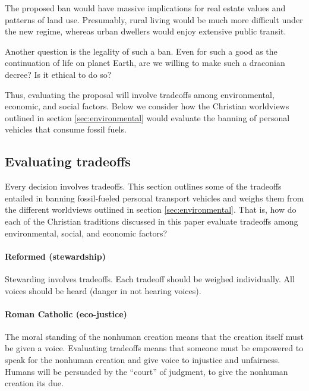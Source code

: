 \documentclass[12pt]{article}
\begin{document}
The proposed ban would have massive implications for real estate values 
and patterns of land use. 
Presumably, rural living would be much more difficult under the new regime,
whereas urban dwellers would enjoy extensive public transit.

Another question is the legality of such a ban. 
Even for such a good as the continuation of life on planet Earth,
are we willing to make such a draconian decree? Is it ethical to do so?

Thus, evaluating the proposal will involve tradeoffs among environmental, economic, and social factors.
Below we consider how the Christian worldviews outlined in section \ref{sec:environmental}
would evaluate the banning of personal vehicles that consume fossil fuels.


\subsection{Evaluating tradeoffs}
\label{sec:evaluating_tradeoffs}
Every decision involves tradeoffs. This section outlines some of the tradeoffs entailed in banning fossil-fueled personal transport vehicles 
and weighs them from the different worldviews outlined in section \ref{sec:environmental}.
That is, how do each of the Christian traditions discussed in this paper 
evaluate tradeoffs among environmental, social, and economic factors?

\paragraph{Reformed (stewardship)} 

Stewarding involves tradeoffs.  %
Each tradeoff should be weighed individually. %
All voices should be heard (danger in not hearing voices). %

\paragraph{Roman Catholic (eco-justice)} 

The moral standing of the nonhuman creation means that 
the creation itself must be given a voice. 
Evaluating tradeoffs means that someone must be empowered 
to speak for the nonhuman creation and 
give voice to injustice and unfairness. 
Humans will be persuaded by the “court” of judgment, 
to give the nonhuman creation its due.
\end{document}
